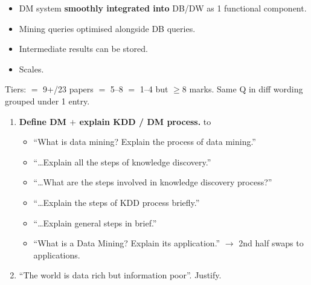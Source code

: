 \begin{itemize}
  \item DM system \textbf{smoothly integrated into} DB/DW as 1 functional component.
  \item Mining queries optimised alongside DB queries.
  \item Intermediate results can be stored.
  \item Scales. 
\end{itemize}

\hr


{\color{sub}\footnotesize Tiers: \tS{} $=$ 9+/23 papers \gap \tF{} $=$ 5--8 \gap \tP{} $=$ 1--4 but $\ge$8 marks.
Same Q in diff wording grouped under 1 entry.}

\begin{enumerate}
  \item {} \textbf{Define DM $+$ explain KDD / DM process.} \hfill {} to 
  \begin{itemize}
    \item ``What is data mining? Explain the process of data mining.'' 
    \item ``\ldots Explain all the steps of knowledge discovery.'' 
    \item ``\ldots What are the steps involved in knowledge discovery process?'' 
    \item ``\ldots Explain the steps of KDD process briefly.'' 
    \item ``\ldots Explain general steps in brief.'' 
    \item ``What is a Data Mining? Explain its application.''  $\rightarrow$ 2nd half swaps to applications.
  \end{itemize}
  \item {} ``The world is data rich but information poor''. Justify. \hfill {} 
\end{enumerate}

